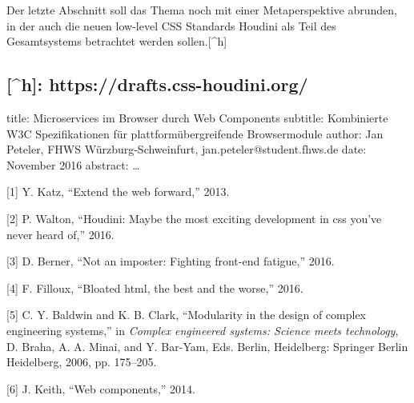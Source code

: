 Der letzte Abschnitt soll das Thema noch mit einer Metaperspektive
abrunden, in der auch die neuen low-level CSS Standards Houdini als Teil
des Gesamtsystems betrachtet werden sollen.{[}\^{}h{]}

\subsection{{[}\^{}h{]}:
https://drafts.css-houdini.org/}\label{h-httpsdrafts.css-houdini.org}

title: Microservices im Browser durch Web Components subtitle:
Kombinierte W3C Spezifikationen für plattformübergreifende Browsermodule
author: Jan Peteler, FHWS Würzburg-Schweinfurt,
jan.peteler@student.fhws.de date: November 2016 abstract: \ldots{}

\hypertarget{refs}{}
\hypertarget{ref-Katz2013}{}
{[}1{]} Y. Katz, ``Extend the web forward,'' 2013.

\hypertarget{ref-Walton2016}{}
{[}2{]} P. Walton, ``Houdini: Maybe the most exciting development in css
you've never heard of,'' 2016.

\hypertarget{ref-Berner2016}{}
{[}3{]} D. Berner, ``Not an imposter: Fighting front-end fatigue,''
2016.

\hypertarget{ref-Filloux2016}{}
{[}4{]} F. Filloux, ``Bloated html, the best and the worse,'' 2016.

\hypertarget{ref-Baldwin2006}{}
{[}5{]} C. Y. Baldwin and K. B. Clark, ``Modularity in the design of
complex engineering systems,'' in \emph{Complex engineered systems:
Science meets technology}, D. Braha, A. A. Minai, and Y. Bar-Yam, Eds.
Berlin, Heidelberg: Springer Berlin Heidelberg, 2006, pp. 175--205.

\hypertarget{ref-Keith2014}{}
{[}6{]} J. Keith, ``Web components,'' 2014.
